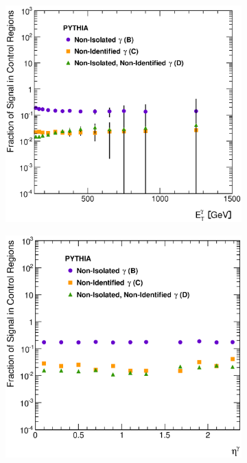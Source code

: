 \documentclass[12pt, twoside]{article}
\numberwithin{equation}{section}
\numberwithin{figure}{section}
\newenvironment{changemargin}[2]{%
\begin{list}{}{%
\setlength{\topsep}{0pt}%
\setlength{\leftmargin}{#1}%
\setlength{\rightmargin}{#2}%
\setlength{\listparindent}{\parindent}%
\setlength{\itemindent}{\parindent}%
\setlength{\parsep}{\parskip}%
}%
\item[]}{\end{list}}
\begin{document}
\begin{figure}
    \centering
    \checkoddpage
    \ifoddpage
        \begin{changemargin}{-1.0cm}{-0.75cm}
    \else
        \begin{changemargin}{-0.75cm}{-1.0cm}
    \fi
        \begin{subfigure}[b]{0.37\textwidth}
            \includegraphics[width=\textwidth]{./images/SignalLeakageFractionsPythia/SLF-101.eps}
            \subcaption{}
            \label{fig:SLFEtPhoton}
        \end{subfigure}
        \begin{subfigure}[b]{0.37\textwidth}
            \includegraphics[width=\textwidth]{./images/SignalLeakageFractionsPythia/SLF-102.eps}

\end{subfigure}
\end{changemargin}
\end{changemargin}
\end{figure}
\end{document}
